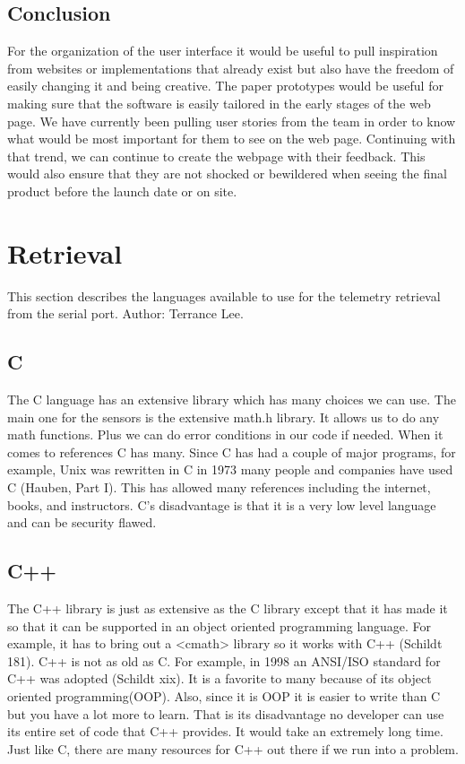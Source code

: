 \documentclass[10pt,draftclsnofoot,onecolumn]{IEEEtran}
\begin{document}
	\subsection{Conclusion}
	For the organization of the user interface it would be useful to pull inspiration from websites or implementations
	that already exist but also have the freedom of easily changing it and being creative. 
	The paper prototypes would be useful for making sure that the software is easily tailored in the early stages of the 
	web page. 
	We have currently been pulling user stories from the team in order to know what would be most important for them to 
	see on the web page. 
	Continuing with that trend, we can continue to create the webpage with their feedback. 
	This would also ensure that they are not shocked or bewildered when seeing the final product before the launch date
	or on site.
	
	\section{Retrieval}
	This section describes the languages available to use for the telemetry retrieval from the serial port. Author: Terrance Lee.

   	\subsection{C}
    The C language has an extensive library which has many choices we can use. 
	The main one for the sensors is the extensive math.h library. 
	It allows us to do any math functions. Plus we can do error conditions in our code if needed. 
	When it comes to references C has many. 
	Since C has had a couple of major programs, for example, Unix was rewritten in C in 1973 many people and companies have
	used C (Hauben, Part I). 
	This has allowed many references including the internet, books, and instructors. C’s disadvantage is that it is a very 
	low level language and can be security flawed.\\

	\subsection{C++}
   	The C++ library is just as extensive as the C library except that it has made it so that it can be supported in an
	object oriented programming language. 
	For example, it has to bring out a <cmath> library so it works with C++ (Schildt 181). 
	C++ is not as old as C. For example, in 1998 an ANSI/ISO standard for C++ was adopted (Schildt xix). 
	It is a favorite to many because of its object oriented programming(OOP). 
	Also, since it is OOP it is easier to write than C but you have a lot more to learn. 
	That is its disadvantage no developer can use its entire set of code that C++ provides. 
	It would take an extremely long time. Just like C, there are many resources for C++ out there if we run into a problem.\\
\end{document}
